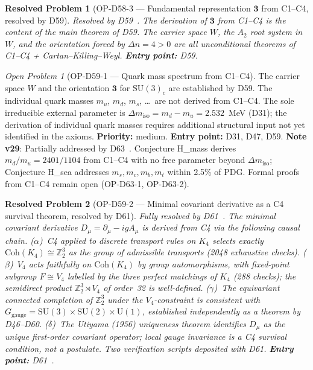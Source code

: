 \documentclass[11pt,a4paper]{article}
\newtheorem{resolvedproblem}{Resolved Problem}
\theoremstyle{plain}
\theoremstyle{definition}
\theoremstyle{remark}
\newtheorem{openproblem}[theorem]{Open Problem}
\begin{document}
\begin{resolvedproblem}[OP-D58-3 --- Fundamental representation $\mathbf{3}$ from C1--C4, resolved by D59]
\label{op:D58three}
\textcolor{proofblue}{Resolved by D59~\cite{D59}.} The derivation of $\mathbf{3}$ from C1--C4 is the content of the main theorem of D59. The carrier space $W$, the $A_2$ root system in $W$, and the orientation forced by $\Delta n = 4 > 0$ are all unconditional theorems of C1--C4 + Cartan--Killing--Weyl. \textbf{Entry point:} D59.
\end{resolvedproblem}

\begin{openproblem}[OP-D59-1 --- Quark mass spectrum from C1--C4]
\label{op:D59one}
The carrier space $W$ and the orientation $\mathbf{3}$ for $\mathrm{SU}(3)_c$ are established by D59. The individual quark masses $m_u$, $m_d$, $m_s$, \ldots\ are not derived from C1--C4. The sole irreducible external parameter is $\Delta m_{\mathrm{iso}} = m_d - m_u = 2.532$~MeV (D31); the derivation of individual quark masses requires additional structural input not yet identified in the axioms. \textbf{Priority:} medium. \textbf{Entry point:} D31, D47, D59. \textbf{Note v29}: Partially addressed by D63~\cite{D63}. Conjecture H\_mass derives $m_d/m_u = 2401/1104$ from C1--C4 with no free parameter beyond $\Delta m_{\mathrm{iso}}$; Conjecture H\_sea addresses $m_s, m_c, m_b, m_t$ within 2.5\% of PDG. Formal proofs from C1--C4 remain open (OP-D63-1, OP-D63-2).
\end{openproblem}
 
\begin{resolvedproblem}[OP-D59-2 --- Minimal covariant derivative as a C4 survival theorem, resolved by D61]
\label{op:D59two}
\textcolor{proofblue}{Fully resolved by D61~\cite{D61}.} The minimal covariant derivative $D_\mu = \partial_\mu - igA_\mu$ is derived from C4 via the following causal chain. ($\alpha$)~C4 applied to discrete transport rules on $K_4$ selects exactly $\mathrm{Coh}(K_4) \cong \mathbb{Z}_2^3$ as the group of admissible transports (2048 exhaustive checks). ($\beta$)~$V_4$ acts faithfully on $\mathrm{Coh}(K_4)$ by group automorphisms, with fixed-point subgroup $F \cong V_4$ labelled by the three perfect matchings of $K_4$ (288 checks); the semidirect product $\mathbb{Z}_2^3 \rtimes V_4$ of order~32 is well-defined. ($\gamma$)~The equivariant connected completion of $\mathbb{Z}_2^3$ under the $V_4$-constraint is consistent with $G_\mathrm{gauge} = \mathrm{SU}(3)\times\mathrm{SU}(2)\times\mathrm{U}(1)$, established independently as a theorem by D46--D60. ($\delta$)~The Utiyama (1956) uniqueness theorem identifies $D_\mu$ as the unique first-order covariant operator; local gauge invariance is a C4 survival condition, not a postulate. Two verification scripts deposited with D61. \textbf{Entry point:} D61~\cite{D61}.
\end{resolvedproblem}
\end{document}
